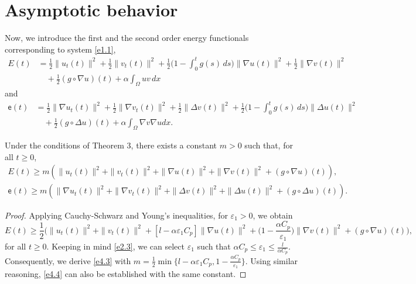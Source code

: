 \section{Asymptotic behavior}

Now, we introduce the first and the second order energy functionals corresponding
to system \eqref{e1.1},
\begin{equation}
\begin{aligned}
E(t) &= \frac{1}{2} \| u_t(t) \|^2 + \frac{1}{2} \| v_t(t) \|^2
 + \frac{1}{2} \Big(1 - \int_0^t g(s) \, ds \Big) \| \nabla u(t) \|^2
 + \frac{1}{2} \| \nabla v(t) \|^2 \\
&\quad + \frac{1}{2} (g \circ \nabla u)(t) + \alpha \int_{\Omega} u v \, dx\label{e4.1}
\end{aligned}
\end{equation}
and
\begin{equation}
\begin{aligned}
 \mathsf{e}(t)
& = \frac{1}{2}\| \nabla u_t(t) \|^2+\frac{1}{2}\| \nabla v_t(t) \|^2
 +\frac{1}{2} \| \Delta v(t) \|^2
 + \frac{1}{2}\Big(1 - \int_0^t g(s) \, ds \Big) \| \Delta u(t) \|^2\\
&\quad + \frac{1}{2}(g \circ \Delta u)(t)
 + \alpha \int_{\Omega}\nabla v \nabla u dx.
\end{aligned}\label{e4.2}
\end{equation}

\begin{lemma} \label{lem4}
Under the conditions of Theorem 3, there exists a constant $m > 0$
such that, for all $ t \geq 0$,
\begin{gather}
E(t) \geq m \left( \| u_t(t) \|^2 + \| v_t(t) \|^2 + \| \nabla u(t) \|^2
+ \| \nabla v(t) \|^2 + (g \circ \nabla u)(t)\right), \label{e4.3} \\
\mathsf{e}(t) \geq m \left( \| \nabla u_t(t) \|^2+\| \nabla v_t(t) \|^2
+ \| \Delta v(t) \|^2 + \| \Delta u(t) \|^2
+ (g \circ \Delta u)(t)\right) .\label{e4.4}
\end{gather}
\end{lemma}

\begin{proof}
Applying Cauchy-Schwarz and Young's inequalities, for
$ \varepsilon_{1} > 0$, we obtain
\[
E(t) \geq \frac{1}{2} \Big( \| u_t(t) \|^2
 + \| v_t(t) \|^2 + \left[ l -\alpha \varepsilon_{1} C_p \right] \| \nabla u(t) \|^2
 + \big( 1-\frac{\alpha C_p}{\varepsilon_{1}}\big) \| \nabla v(t) \|^2
 + (g \circ \nabla u)(t)\Big),
 \]
 for all $t\geq 0$.
Keeping in mind \eqref{e2.3}, we can select $\varepsilon_{1}$ such that
 $\alpha C_p \leq \varepsilon_{1}\leq \frac{l}{\alpha C_p}$.
Consequently, we derive \eqref{e4.3} with
$ m = \frac{1}{2} \min \{ l -\alpha \varepsilon_{1} C_p,
1-\frac{\alpha C_p }{\varepsilon_{1}} \} $.
Using similar reasoning, \eqref{e4.4} can also be established with the same constant.
\end{proof}

